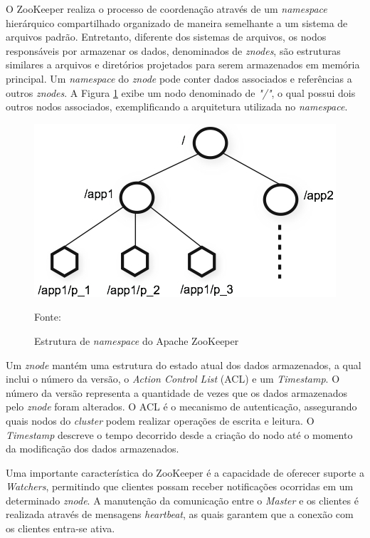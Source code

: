 O ZooKeeper realiza o processo de coordenação através de um \textit{namespace} hierárquico compartilhado organizado de maneira semelhante a um sistema de arquivos padrão. Entretanto, diferente dos sistemas de arquivos, os nodos responsáveis por armazenar os dados, denominados de \textit{znodes}, são estruturas similares a arquivos e diretórios projetados para serem armazenados em memória principal. Um \textit{namespace} do \textit{znode} pode conter dados associados e referências a outros \textit{znodes}.  A Figura \ref{fig:ZookeeperNamespace} exibe um nodo denominado de \textit{"/"}, o qual possui dois outros nodos associados, exemplificando a arquitetura utilizada no \textit{namespace}.

\begin{figure}[!ht]
    \caption{Estrutura de \textit{namespace} do Apache ZooKeeper}
    \begin{center}
        \includegraphics[scale=0.5]{imagens/Zookeeper-namespace.png}
    \end{center}
    \small{Fonte: \cite{haloi2015apache}}
    \label{fig:ZookeeperNamespace}
\end{figure}

Um \textit{znode} mantém uma estrutura do estado atual dos dados armazenados, a qual inclui o número da versão, o \textit{Action Control List} (ACL) e um \textit{Timestamp}. O número da versão representa a quantidade de vezes que os dados armazenados pelo \textit{znode} foram alterados.  O ACL é o mecanismo de autenticação, assegurando quais nodos do \textit{cluster} podem realizar operações de escrita e leitura. O \textit{Timestamp} descreve o tempo decorrido desde a criação do nodo até o momento da modificação dos dados armazenados. 

Uma importante característica do ZooKeeper é a capacidade de oferecer suporte a \textit{Watchers}, permitindo que clientes possam receber notificações ocorridas em um determinado \textit{znode}. A manutenção da comunicação entre o \textit{Master} e os clientes é realizada através de mensagens \textit{heartbeat}, as quais garantem que a conexão com os clientes entra-se ativa.

